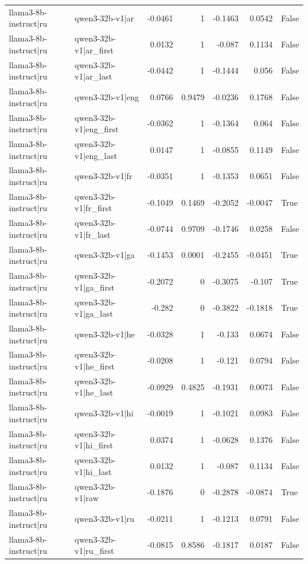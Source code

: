 \begin{table}
\begin{tabular}{l l r r r r l}
llama3-8b-instruct|ru & qwen3-32b-v1|ar & -0.0461 & 1 & -0.1463 & 0.0542 & False \\
llama3-8b-instruct|ru & qwen3-32b-v1|ar_first & 0.0132 & 1 & -0.087 & 0.1134 & False \\
llama3-8b-instruct|ru & qwen3-32b-v1|ar_last & -0.0442 & 1 & -0.1444 & 0.056 & False \\
llama3-8b-instruct|ru & qwen3-32b-v1|eng & 0.0766 & 0.9479 & -0.0236 & 0.1768 & False \\
llama3-8b-instruct|ru & qwen3-32b-v1|eng_first & -0.0362 & 1 & -0.1364 & 0.064 & False \\
llama3-8b-instruct|ru & qwen3-32b-v1|eng_last & 0.0147 & 1 & -0.0855 & 0.1149 & False \\
llama3-8b-instruct|ru & qwen3-32b-v1|fr & -0.0351 & 1 & -0.1353 & 0.0651 & False \\
llama3-8b-instruct|ru & qwen3-32b-v1|fr_first & -0.1049 & 0.1469 & -0.2052 & -0.0047 & True \\
llama3-8b-instruct|ru & qwen3-32b-v1|fr_last & -0.0744 & 0.9709 & -0.1746 & 0.0258 & False \\
llama3-8b-instruct|ru & qwen3-32b-v1|ga & -0.1453 & 0.0001 & -0.2455 & -0.0451 & True \\
llama3-8b-instruct|ru & qwen3-32b-v1|ga_first & -0.2072 & 0 & -0.3075 & -0.107 & True \\
llama3-8b-instruct|ru & qwen3-32b-v1|ga_last & -0.282 & 0 & -0.3822 & -0.1818 & True \\
llama3-8b-instruct|ru & qwen3-32b-v1|he & -0.0328 & 1 & -0.133 & 0.0674 & False \\
llama3-8b-instruct|ru & qwen3-32b-v1|he_first & -0.0208 & 1 & -0.121 & 0.0794 & False \\
llama3-8b-instruct|ru & qwen3-32b-v1|he_last & -0.0929 & 0.4825 & -0.1931 & 0.0073 & False \\
llama3-8b-instruct|ru & qwen3-32b-v1|hi & -0.0019 & 1 & -0.1021 & 0.0983 & False \\
llama3-8b-instruct|ru & qwen3-32b-v1|hi_first & 0.0374 & 1 & -0.0628 & 0.1376 & False \\
llama3-8b-instruct|ru & qwen3-32b-v1|hi_last & 0.0132 & 1 & -0.087 & 0.1134 & False \\
llama3-8b-instruct|ru & qwen3-32b-v1|raw & -0.1876 & 0 & -0.2878 & -0.0874 & True \\
llama3-8b-instruct|ru & qwen3-32b-v1|ru & -0.0211 & 1 & -0.1213 & 0.0791 & False \\
llama3-8b-instruct|ru & qwen3-32b-v1|ru_first & -0.0815 & 0.8586 & -0.1817 & 0.0187 & False \\

\end{tabular}
\end{table}
